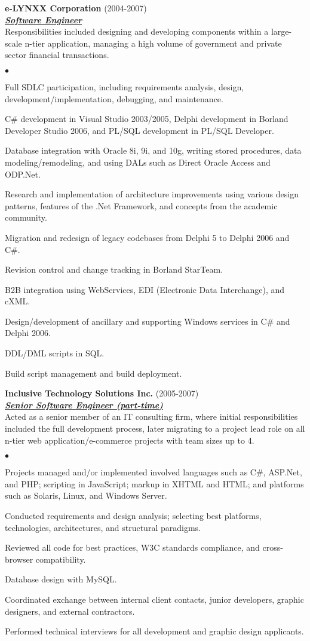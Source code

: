 \documentclass{article}
\newcommand{\employer}[3]{{ \textbf{#1} (#2)\\ \underline{\textbf{\emph{#3}}}\\  }}
\newenvironment{achievements}{\begin{list}{$\bullet$}{\topsep 0pt \itemsep
      -2pt}}{\vspace*{4pt}\end{list}}
\begin{document}
\employer{e-LYNXX Corporation}{2004-2007}{Software Engineer} Responsibilities
included designing and developing components within a large-scale n-tier
application, managing a high volume of government and private sector financial
transactions.
\begin{achievements}
\item Full SDLC participation, including requirements analysis, design,
  development/implementation, debugging, and maintenance.
\item C\# development in Visual Studio 2003/2005, Delphi development in Borland
  Developer Studio 2006, and PL/SQL development in PL/SQL Developer.
\item Database integration with Oracle 8i, 9i, and 10g, writing stored
  procedures, data modeling/remodeling, and using DALs such as Direct Oracle
  Access and ODP.Net.
\item Research and implementation of architecture improvements using various
  design patterns, features of the .Net Framework, and concepts from the
  academic community.
\item Migration and redesign of legacy codebases from Delphi 5 to Delphi 2006
  and C\#.
\item Revision control and change tracking in Borland StarTeam.
\item B2B integration using WebServices, EDI (Electronic Data Interchange), and
  cXML.
\item Design/development of ancillary and supporting Windows services in C\# and
  Delphi 2006.
\item DDL/DML scripts in SQL.
\item Build script management and build deployment.
\end{achievements}

\employer{Inclusive Technology Solutions Inc.}{2005-2007}{Senior Software
  Engineer (part-time)} Acted as a senior member of an IT consulting firm,
where initial responsibilities included the full development process, later
migrating to a project lead role on all n-tier web application/e-commerce
projects with team sizes up to 4.
\begin{achievements}
\item Projects managed and/or implemented involved languages such as C\#,
  ASP.Net, and PHP; scripting in JavaScript; markup in XHTML and HTML; and
  platforms such as Solaris, Linux, and Windows Server.
\item Conducted requirements and design analysis; selecting best platforms,
  technologies, architectures, and structural paradigms.
\item Reviewed all code for best practices, W3C standards compliance, and
  cross-browser compatibility.
\item Database design with MySQL.
\item Coordinated exchange between internal client contacts, junior developers,
  graphic designers, and external contractors.
\item Performed technical interviews for all development and graphic design
  applicants.
\end{achievements}
\end{document}
